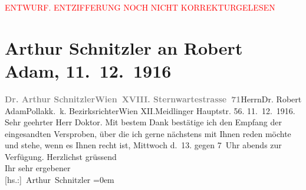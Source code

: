 
\begin{center}
            \textcolor{red}{ENTWURF. ENTZIFFERUNG NOCH NICHT KORREKTURGELESEN}
                      \end{center}
            
               \section[Arthur Schnitzler an Robert Adam, 11. 12. 1916]{ Arthur Schnitzler an Robert Adam, 11. 12. 1916}\nopagebreak{}\rehead{ }\begin{ledgroupsized}[t]{13cm}\normalsize\beginnumbering{} \toendnotes[C]{\smallbreak\pagebreak[2]} 
\pstart{}{\pb}\textcolor{gray}{\textbf{Dr. Arthur Schnitzler}}\pend{}\pstart{}\textcolor{gray}{\textbf{Wien XVIII. Sternwartestrasse 71}}\pend{}{\bigskip}\pstart{}Herrn\pend{}\pstart{}Dr. Robert Adam\pend{}\pstart{}Pollak\pend{}\pstart{}k. k. Bezirksrichter\pend{}\pstart{}Wien XII.\pend{}\pstart{}Meidlinger Hauptstr. 56.\pend{}{\bigskip}\pstart
           \raggedleft{}{\pb}11. 12. 1916.\pend
           \pstart{}Sehr geehrter Herr Doktor.\pend\pstart
           Mit bestem Dank bestätige ich den Empfang der eingesandten Versproben, über die
                    ich gerne nächstens mit Ihnen reden möchte und stehe, wenn es Ihnen recht ist,
                        Mittwoch d. 13. gegen 7 Uhr abends zur
                    Verfügung.\pend
           \pstart
           Herzlichst grüssend{\\[\baselineskip]}Ihr sehr ergebener{\\[\baselineskip]}\spacefill\mbox{{[}hs.:{]} Arthur Schnitzler}\pend
           \leftskip=0em{}\endnumbering{}\end{ledgroupsized}  \newcommand{\dateiname}{L02250}\newcommand{\titel}{Arthur Schnitzler an Robert Adam, 11. 12. 1916}\newcommand{\editorInnen}{Martin Anton Müller und Gerd-Hermann Susen}
      